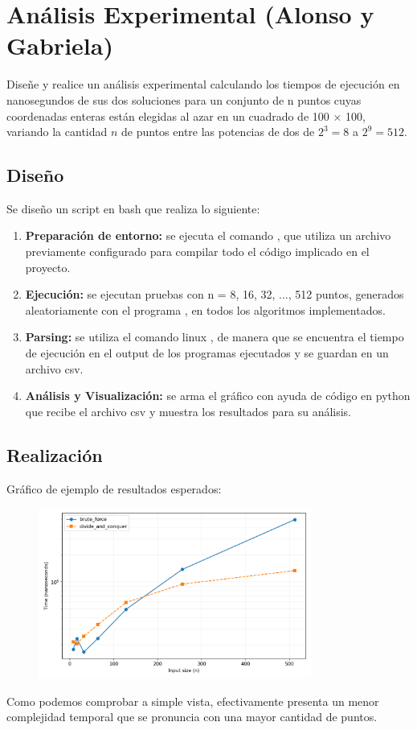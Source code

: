 \documentclass[informe.tex]{subfiles}
\begin{document}
\section{Análisis Experimental (Alonso y Gabriela)}
Diseñe y realice un análisis experimental calculando los tiempos de
ejecución en nanosegundos de sus dos soluciones para un conjunto de n puntos cuyas coordenadas
enteras están elegidas al azar en un cuadrado de 100 × 100, variando la cantidad $n$ de puntos entre
las potencias de dos de $2^3 = 8$ a $2^9 = 512$.

\subsection{Diseño}

Se diseño un script en bash  que realiza lo siguiente:
\begin{enumerate}
	\item \textbf{Preparación de entorno:} se ejecuta el comando , que utiliza
	      un archivo  previamente configurado para compilar todo el código implicado en
	      el proyecto.
	\item \textbf{Ejecución:} se ejecutan pruebas con n = 8, 16, 32, ..., 512
	      puntos, generados aleatoriamente con el programa , en todos los
	      algoritmos implementados.
	\item \textbf{Parsing:} se utiliza el comando linux , de manera que se
	      encuentra el tiempo de ejecución en el output de los programas ejecutados y se guardan en un
	      archivo csv.
	\item \textbf{Análisis y Visualización:} se arma el gráfico con ayuda de código en python que
	      recibe el archivo csv y muestra los resultados para su análisis.
\end{enumerate}

\subsection{Realización}

Gráfico de ejemplo de resultados esperados:
\begin{figure}[h]
	\centering \includegraphics[width=0.8\textwidth]{img/plot_bf_dv.png}
\end{figure}
Como podemos comprobar a simple vista, efectivamente  presenta un menor
complejidad temporal que se pronuncia con una mayor cantidad de puntos.
\end{document}
